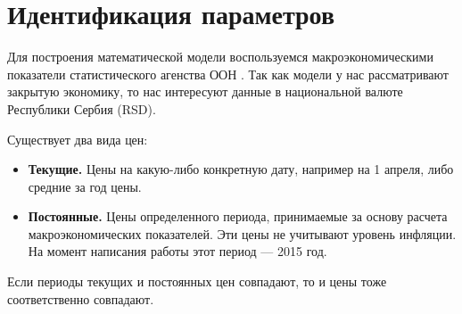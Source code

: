 \chapter{Идентификация параметров}
\label{cha:ident_params}

Для построения математической модели воспользуемся макроэкономическими показатели статистического агенства ООН \cite{unstat}.
Так как модели у нас рассматривают закрытую экономику, то нас интересуют данные в национальной валюте Республики Сербия (RSD).

Существует два вида цен:
\begin{itemize}
	\item \textbf{Текущие.}
	Цены на какую-либо конкретную дату, например на 1 апреля, либо средние за год цены.
	\item \textbf{Постоянные.}
	Цены определенного периода, принимаемые за основу расчета макроэкономических показателей.
	Эти цены не учитывают уровень инфляции.
	На момент написания работы этот период --- 2015 год.
\end{itemize}
Если периоды текущих и постоянных цен совпадают, то и цены тоже соответственно совпадают.

